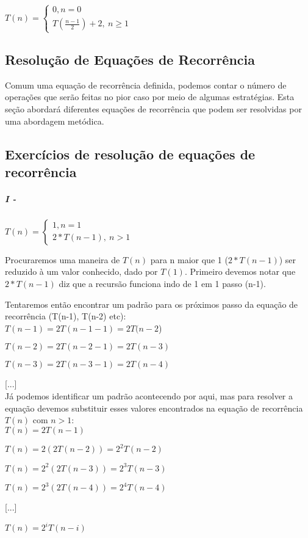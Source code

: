 \documentclass[a4paper, twocolumn]{article}
\theoremstyle{definition}
\begin{document}
$T(n) = \begin{cases} 
	0, n  = 0\\
	T(\frac{n-1}{2}) + 2, \ n \geq 1
\end{cases}$

\subsection{Resolução de Equações de Recorrência}
Comum uma equação de recorrência definida, podemos contar o número de operações que serão feitas no pior caso por meio de algumas estratégias. Esta seção abordará diferentes equações de recorrência que podem ser resolvidas por uma abordagem metódica.

\subsection{Exercícios de resolução de equações de recorrência}
\subparagraph{I - } {$T(n) = \begin{cases} 
		1, n  = 1\\
		2*T(n-1), \ n > 1
	\end{cases}$}

Procuraremos uma maneira de $T(n)$ para n maior que 1 ($2*T(n-1)$) ser reduzido à um valor conhecido, dado por $T(1)$. Primeiro devemos notar que $2*T(n-1)$ diz que a recursão funciona indo de 1 em 1 passo (n-1).

Tentaremos então encontrar um padrão para os próximos passo da equação de recorrência (T(n-1), T(n-2) etc): \\

$T(n-1) = 2T(n-1-1) = 2T(n-2$)

$T(n-2) = 2T(n-2-1) = 2T(n-3)$

$T(n-3) = 2T(n-3-1) = 2T(n-4)$

[...] \\

Já podemos identificar um padrão acontecendo por aqui, mas para resolver a equação devemos substituir esses valores encontrados na equação de recorrência $T(n)$ com $n > 1$: \\

$T(n) = 2T(n-1)$ 

$T(n) = 2(2T(n-2)) = 2^{2}T(n-2)$

$T(n) = 2^{2}(2T(n-3)) = 2^{3}T(n-3)$

$T(n) = 2^{3}(2T(n-4)) = 2^{4}T(n-4)$

[...]


$T(n) = 2^{i}T(n-i)$
\end{document}
